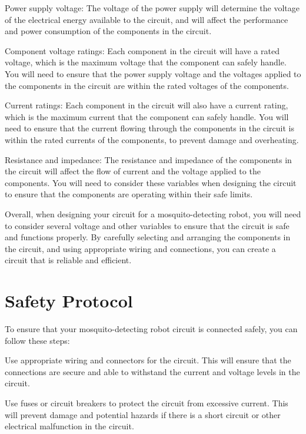\documentclass[11pt]{article}
\begin{document}
	Power supply voltage: The voltage of the power supply will determine the voltage of the electrical energy available to the circuit, and will affect the performance and power consumption of the components in the circuit.
	
	Component voltage ratings: Each component in the circuit will have a rated voltage, which is the maximum voltage that the component can safely handle. You will need to ensure that the power supply voltage and the voltages applied to the components in the circuit are within the rated voltages of the components.
	
	Current ratings: Each component in the circuit will also have a current rating, which is the maximum current that the component can safely handle. You will need to ensure that the current flowing through the components in the circuit is within the rated currents of the components, to prevent damage and overheating.
	
	Resistance and impedance: The resistance and impedance of the components in the circuit will affect the flow of current and the voltage applied to the components. You will need to consider these variables when designing the circuit to ensure that the components are operating within their safe limits.
	
	Overall, when designing your circuit for a mosquito-detecting robot, you will need to consider several voltage and other variables to ensure that the circuit is safe and functions properly. By carefully selecting and arranging the components in the circuit, and using appropriate wiring and connections, you can create a circuit that is reliable and efficient.
	
	
	
	
	\section{Safety Protocol}
	
	
	To ensure that your mosquito-detecting robot circuit is connected safely, you can follow these steps:
	
	Use appropriate wiring and connectors for the circuit. This will ensure that the connections are secure and able to withstand the current and voltage levels in the circuit.
	
	Use fuses or circuit breakers to protect the circuit from excessive current. This will prevent damage and potential hazards if there is a short circuit or other electrical malfunction in the circuit.
	
\end{document}
